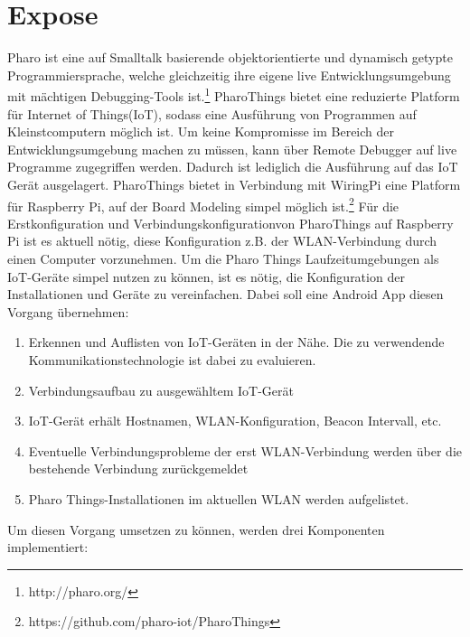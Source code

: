 \documentclass[12pt,a4paper]{article}
\begin{document}
    \section{Expose}
        Pharo ist eine auf Smalltalk basierende objektorientierte und dynamisch getypte Programmiersprache,
        welche gleichzeitig ihre eigene live Entwicklungsumgebung mit mächtigen Debugging-Tools ist.\footnote{http://pharo.org/}
        PharoThings bietet eine reduzierte Platform für  Internet of Things(IoT), sodass eine Ausführung von Programmen auf Kleinstcomputern möglich ist.
        Um keine Kompromisse im Bereich der Entwicklungsumgebung machen zu müssen, kann über Remote Debugger auf live Programme zugegriffen werden.
        Dadurch ist lediglich die Ausführung auf das IoT Gerät ausgelagert. PharoThings bietet in Verbindung mit WiringPi eine Platform für Raspberry Pi,
        auf der Board Modeling simpel möglich ist.\footnote{https://github.com/pharo-iot/PharoThings}
        Für die Erstkonfiguration und Verbindungskonfigurationvon PharoThings auf Raspberry Pi ist es aktuell nötig,
        diese Konfiguration z.B. der WLAN-Verbindung durch einen Computer vorzunehmen.
        Um die Pharo Things Laufzeitumgebungen als IoT-Geräte simpel nutzen zu können, ist es nötig,
        die Konfiguration der Installationen und Geräte zu vereinfachen. Dabei soll eine Android App diesen Vorgang übernehmen:
        \begin{enumerate}
            \item Erkennen und Auflisten von IoT-Geräten in der Nähe. Die zu verwendende Kommunikationstechnologie ist dabei zu evaluieren.
            \item Verbindungsaufbau zu ausgewähltem IoT-Gerät
            \item IoT-Gerät erhält Hostnamen, WLAN-Konfiguration, Beacon Intervall, etc.
            \item Eventuelle Verbindungsprobleme der erst WLAN-Verbindung werden über die bestehende Verbindung zurückgemeldet
            \item Pharo Things-Installationen im aktuellen WLAN werden aufgelistet.
        \end{enumerate}
        Um diesen Vorgang umsetzen zu können, werden drei Komponenten implementiert:
\end{document}
